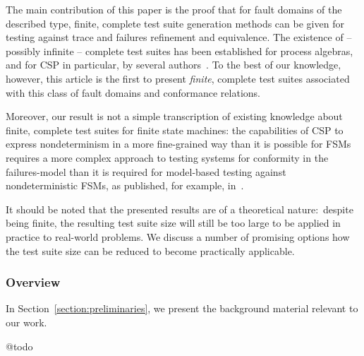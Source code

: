 The main contribution of this paper is the proof that for fault domains of
the described type, finite, complete test suite generation methods can be
given for testing against trace and failures refinement and equivalence. The
existence of -- possibly infinite -- complete test suites has been
established for process algebras, and for CSP in particular, by several
authors~\cite{Hennessy:1988:ATP:50497,Schneider:1995:OST:203471.203475,DBLP:conf/fm/PeleskaS96,peleska1997a,DBLP:conf/pts/CavalcantiS17}.
To the best of our knowledge, however, this article is the first to present
{\it finite}, complete test suites associated with this class of fault
domains and conformance relations.

Moreover, our result is not a simple transcription of existing knowledge
about finite, complete test suites for finite state machines: the
capabilities of CSP to express nondeterminism in a more fine-grained way than
it is possible for FSMs requires a more complex approach to testing systems
for conformity in the failures-model than it is required for model-based
testing against nondeterministic FSMs, as published, for example,
in~\cite{hierons_testing_2004,DBLP:conf/hase/PetrenkoY14}.

It should be noted that the presented results are of a theoretical
nature:~despite being finite, the resulting test suite size will still be too
large to be applied in practice to real-world problems. We discuss a number
of promising options how the test suite size can be reduced to become
practically applicable.


\subsubsection*{Overview}
In Section~\ref{section:preliminaries},
we present the background material relevant to our work.

@todo


